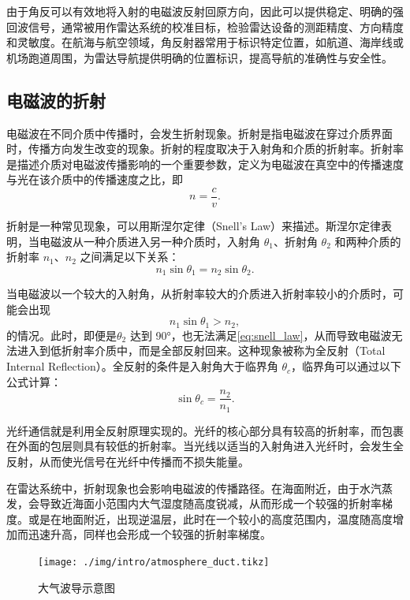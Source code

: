 由于角反可以有效地将入射的电磁波反射回原方向，因此可以提供稳定、明确的强回波信号，通常被用作雷达系统的校准目标，检验雷达设备的测距精度、方向精度和灵敏度。在航海与航空领域，角反射器常用于标识特定位置，如航道、海岸线或机场跑道周围，为雷达导航提供明确的位置标识，提高导航的准确性与安全性。


\subsection{电磁波的折射}

电磁波在不同介质中传播时，会发生折射现象。折射是指电磁波在穿过介质界面时，传播方向发生改变的现象。折射的程度取决于入射角和介质的折射率。折射率是描述介质对电磁波传播影响的一个重要参数，定义为电磁波在真空中的传播速度与光在该介质中的传播速度之比，即
\begin{equation}
    n = \frac{c}{v}.
    \label{eq:refraction_index}
\end{equation}

折射是一种常见现象，可以用斯涅尔定律（Snell's Law）来描述。斯涅尔定律表明，当电磁波从一种介质进入另一种介质时，入射角 $\theta_1$、折射角 $\theta_2$ 和两种介质的折射率 $n_1$、$n_2$ 之间满足以下关系：
\begin{equation}
    n_1 \sin \theta_1 = n_2 \sin \theta_2.
    \label{eq:snell_law}
\end{equation}

当电磁波以一个较大的入射角，从折射率较大的介质进入折射率较小的介质时，可能会出现
\[
    n_1 \sin \theta_1 > n_2,
\]
的情况。此时，即便是\( \theta_2 \) 达到 90°，也无法满足\cref{eq:snell_law}，从而导致电磁波无法进入到低折射率介质中，而是全部反射回来。这种现象被称为全反射（Total Internal Reflection）。全反射的条件是入射角大于临界角 $\theta_c$，临界角可以通过以下公式计算：
\begin{equation}
    \sin \theta_c = \frac{n_2}{n_1}.
    \label{eq:critical_angle}
\end{equation}

光纤通信就是利用全反射原理实现的。光纤的核心部分具有较高的折射率，而包裹在外面的包层则具有较低的折射率。当光线以适当的入射角进入光纤时，会发生全反射，从而使光信号在光纤中传播而不损失能量。

在雷达系统中，折射现象也会影响电磁波的传播路径。在海面附近，由于水汽蒸发，会导致近海面小范围内大气湿度随高度锐减，从而形成一个较强的折射率梯度。或是在地面附近，出现逆温层，此时在一个较小的高度范围内，温度随高度增加而迅速升高，同样也会形成一个较强的折射率梯度。

\begin{figure}[htb!]
    \centering
    \texttt{[image: ./img/intro/atmosphere\_duct.tikz]}
    \caption{大气波导示意图}
    \label{fig_chp1_atmosphere_duct}
\end{figure}

